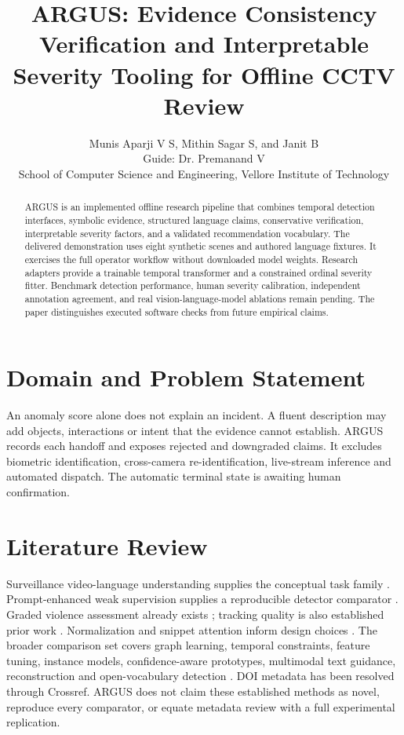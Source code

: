 \documentclass[journal]{IEEEtran}
\title{ARGUS: Evidence Consistency Verification and Interpretable Severity Tooling for Offline CCTV Review}
\author{Munis Aparji V S, Mithin Sagar S, and Janit B\\Guide: Dr. Premanand V\\School of Computer Science and Engineering, Vellore Institute of Technology}
\begin{document}
\maketitle
\begin{abstract}
ARGUS is an implemented offline research pipeline that combines temporal detection interfaces, symbolic evidence, structured language claims, conservative verification, interpretable severity factors, and a validated recommendation vocabulary. The delivered demonstration uses eight synthetic scenes and authored language fixtures. It exercises the full operator workflow without downloaded model weights. Research adapters provide a trainable temporal transformer and a constrained ordinal severity fitter. Benchmark detection performance, human severity calibration, independent annotation agreement, and real vision-language-model ablations remain pending. The paper distinguishes executed software checks from future empirical claims.
\end{abstract}
\section{Domain and Problem Statement}
An anomaly score alone does not explain an incident. A fluent description may add objects, interactions or intent that the evidence cannot establish. ARGUS records each handoff and exposes rejected and downgraded claims. It excludes biometric identification, cross-camera re-identification, live-stream inference and automated dispatch. The automatic terminal state is awaiting human confirmation.
\section{Literature Review}
Surveillance video-language understanding supplies the conceptual task family \cite{ref1}. Prompt-enhanced weak supervision supplies a reproducible detector comparator \cite{ref2}. Graded violence assessment already exists \cite{ref3}; tracking quality is also established prior work \cite{ref4}. Normalization and snippet attention inform design choices \cite{ref5,ref6}. The broader comparison set covers graph learning, temporal constraints, feature tuning, instance models, confidence-aware prototypes, multimodal text guidance, reconstruction and open-vocabulary detection \cite{ref7,ref8,ref9,ref10,ref11,ref12,ref13,ref14,ref15}. DOI metadata has been resolved through Crossref. ARGUS does not claim these established methods as novel, reproduce every comparator, or equate metadata review with a full experimental replication.
\end{document}
